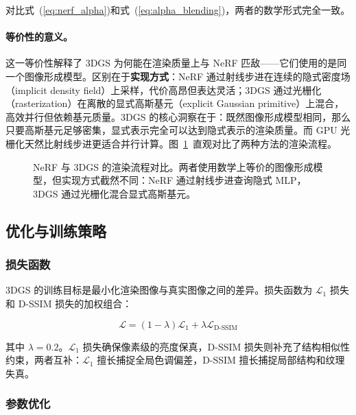 对比式~(\ref{eq:nerf_alpha})和式~(\ref{eq:alpha_blending})，两者的数学形式完全一致。

\paragraph{等价性的意义。} 这一等价性解释了 3DGS 为何能在渲染质量上与 NeRF 匹敌——它们使用的是同一个图像形成模型。区别在于\textbf{实现方式}：NeRF 通过射线步进在连续的隐式密度场（implicit density field）上采样，代价高昂但表达灵活；3DGS 通过光栅化（rasterization）在离散的显式高斯基元（explicit Gaussian primitive）上混合，高效并行但依赖基元质量。3DGS 的核心洞察在于：既然图像形成模型相同，那么只要高斯基元足够密集，显式表示完全可以达到隐式表示的渲染质量。而 GPU 光栅化天然比射线步进更适合并行计算。图~\ref{fig:01_nerf_vs_3dgs}~直观对比了两种方法的渲染流程。

\begin{figure}[htbp]
\centering
\resizebox{0.85\textwidth}{!}{}
\caption{NeRF 与 3DGS 的渲染流程对比。两者使用数学上等价的图像形成模型，但实现方式截然不同：NeRF 通过射线步进查询隐式 MLP，3DGS 通过光栅化混合显式高斯基元。}
\label{fig:01_nerf_vs_3dgs}
\end{figure}

\subsection{优化与训练策略}
\label{sec:01_1_3}

\subsubsection{损失函数}

3DGS 的训练目标是最小化渲染图像与真实图像之间的差异。损失函数为 $\mathcal{L}_1$ 损失和 D-SSIM 损失的加权组合：

\begin{equation}
\label{eq:loss}
\mathcal{L} = (1 - \lambda)\mathcal{L}_1 + \lambda\mathcal{L}_{\text{D-SSIM}}
\end{equation}

其中 $\lambda = 0.2$。$\mathcal{L}_1$ 损失确保像素级的亮度保真，D-SSIM 损失则补充了结构相似性约束，两者互补：$\mathcal{L}_1$ 擅长捕捉全局色调偏差，D-SSIM 擅长捕捉局部结构和纹理失真。

\subsubsection{参数优化}


